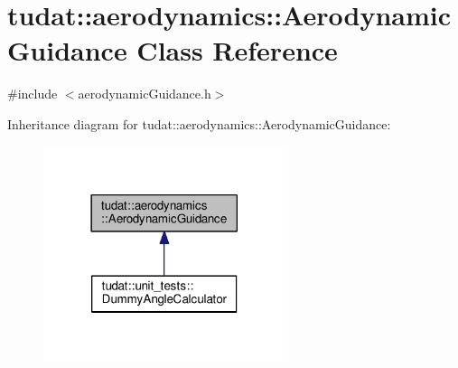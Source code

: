 \hypertarget{classtudat_1_1aerodynamics_1_1AerodynamicGuidance}{}\section{tudat\+:\+:aerodynamics\+:\+:Aerodynamic\+Guidance Class Reference}
\label{classtudat_1_1aerodynamics_1_1AerodynamicGuidance}


{\ttfamily \#include $<$aerodynamic\+Guidance.\+h$>$}



Inheritance diagram for tudat\+:\+:aerodynamics\+:\+:Aerodynamic\+Guidance\+:
\nopagebreak
\begin{figure}[H]
\begin{center}
\leavevmode
\includegraphics[width=201pt]{classtudat_1_1aerodynamics_1_1AerodynamicGuidance__inherit__graph}
\end{center}
\end{figure}
